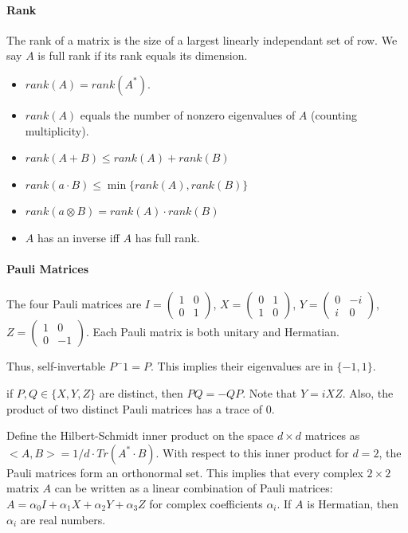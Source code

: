 \paragraph{Rank}
The rank of a matrix is the size of a largest linearly independant set of row.
We say $A$ is full rank if its rank equals its dimension.
\begin{itemize}
    \item $rank(A)=rank(A^*)$.
    \item $rank(A)$ equals the number of nonzero eigenvalues of $A$ (counting multiplicity).
    \item $rank(A+B)\le rank(A)+rank(B)$
    \item $rank(a\cdot B)\le \min\{rank(A),rank(B)\}$
    \item $rank(a\otimes B) = rank(A)\cdot rank(B)$
    \item $A$ has an inverse iff $A$ has full rank.
\end{itemize}

\paragraph{Pauli Matrices}
The four Pauli matrices are $I=\begin{pmatrix}
    1 & 0 \\
    0 & 1
\end{pmatrix}$, $X=\begin{pmatrix}
    0 & 1 \\
    1 & 0
\end{pmatrix}$, $Y=\begin{pmatrix}
    0 & -i \\
    i & 0
\end{pmatrix}$, $Z=\begin{pmatrix}
    1 & 0 \\
    0 & -1
\end{pmatrix}$.
Each Pauli matrix is both unitary and Hermatian.

Thus, self-invertable $P^-1=P$. This implies their eigenvalues are in $\{-1,1\}$.

if $P,Q\in\{X,Y,Z\}$ are distinct, then  $PQ=-QP$. Note that $Y=iXZ$.
Also, the product of two distinct Pauli matrices has a trace of 0.

Define the Hilbert-Schmidt inner product on the space $d\times d$ matrices as $<A,B>=1/d \cdot Tr(A^*\cdot B)$.
With respect to this inner product for $d=2$, the Pauli matrices form an orthonormal set.
This implies that every complex $2\times2$ matrix $A$ can be written as a linear combination of Pauli matrices: 
$A=\alpha_0I+\alpha_1X+\alpha_2Y+\alpha_3Z$ for complex coefficients $\alpha_i$.
If $A$ is Hermatian, then $\alpha_i$ are real numbers. 

